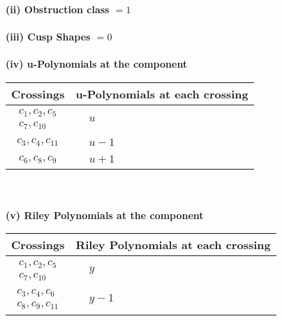 \documentclass[1p]{elsarticle_modified}
\theoremstyle{definition}
\begin{document}
\flushleft \textbf{(ii) Obstruction class $= 1$}\\~\\
\flushleft \textbf{(iii) Cusp Shapes $= 0$}\\~\\
\newpage\renewcommand{\arraystretch}{1}
\flushleft \textbf{(iv) u-Polynomials at the component}\newline \\
\begin{tabular}{m{50pt}|m{274pt}}
Crossings & \hspace{64pt}u-Polynomials at each crossing \\
\hline $$\begin{aligned}c_{1},c_{2},c_{5}\\c_{7},c_{10}\end{aligned}$$&$\begin{aligned}
&u
\end{aligned}$\\
\hline $$\begin{aligned}c_{3},c_{4},c_{11}\end{aligned}$$&$\begin{aligned}
&u-1
\end{aligned}$\\
\hline $$\begin{aligned}c_{6},c_{8},c_{9}\end{aligned}$$&$\begin{aligned}
&u+1
\end{aligned}$\\
\hline
\end{tabular}\\~\\
\newpage\renewcommand{\arraystretch}{1}
\flushleft \textbf{(v) Riley Polynomials at the component}\newline \\
\begin{tabular}{m{50pt}|m{274pt}}
Crossings & \hspace{64pt}Riley Polynomials at each crossing \\
\hline $$\begin{aligned}c_{1},c_{2},c_{5}\\c_{7},c_{10}\end{aligned}$$&$\begin{aligned}
&y
\end{aligned}$\\
\hline $$\begin{aligned}c_{3},c_{4},c_{6}\\c_{8},c_{9},c_{11}\end{aligned}$$&$\begin{aligned}
&y-1
\end{aligned}$\\
\hline
\end{tabular}\\~\\
\end{document}
